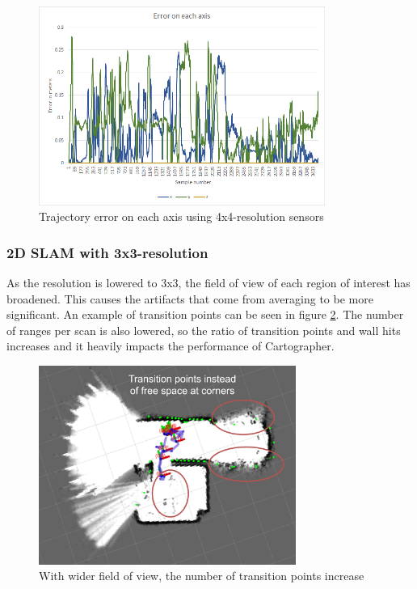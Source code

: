 \begin{figure}[!h]
    \centering
	\includegraphics[height=65mm, keepaspectratio]{figures/02_trajectory_error.png}
    \caption{Trajectory error on each axis using 4x4-resolution sensors}
    \label{fig:02_trajectory_error}
\end{figure}







\subsubsection{2D SLAM with 3x3-resolution}
As the resolution is lowered to 3x3, the field of view of each region of interest has broadened.
This causes the artifacts that come from averaging to be more significant. An example of transition
points can be seen in figure \ref{fig:03_artifacts}. The number of ranges per scan is also lowered,
so the ratio of transition points and wall hits increases and it heavily impacts the performance of
Cartographer.

\begin{figure}[!h]
    \centering
	\includegraphics[height=65mm, keepaspectratio]{figures/03_artifacts.png}
    \caption{With wider field of view, the number of transition points increase}
    \label{fig:03_artifacts}
\end{figure}

